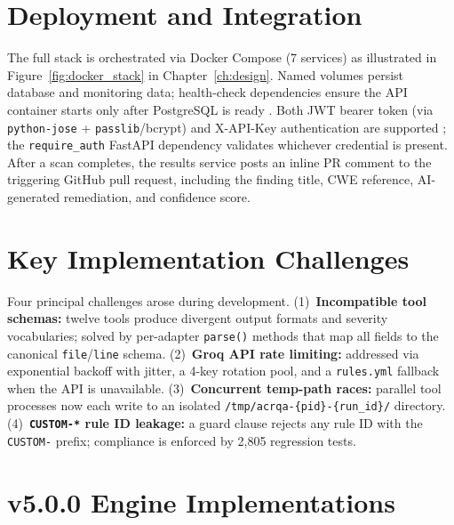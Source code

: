 \section{Deployment and Integration}
\label{sec:docker_impl}

The full stack is orchestrated via Docker Compose (7 services) as illustrated in Figure~\ref{fig:docker_stack} in Chapter~\ref{ch:design}. Named volumes persist database and monitoring data; health-check dependencies ensure the API container starts only after PostgreSQL is ready \cite{docker_security}. Both JWT bearer token (via \texttt{python-jose} + \texttt{passlib}/bcrypt) and X-API-Key authentication are supported \cite{owasp_api_top10}; the \texttt{require\_auth} FastAPI dependency validates whichever credential is present. After a scan completes, the results service posts an inline PR comment to the triggering GitHub pull request, including the finding title, CWE reference, AI-generated remediation, and confidence score.

\section{Key Implementation Challenges}
\label{sec:challenges}

Four principal challenges arose during development. (1)~\textbf{Incompatible tool schemas:} twelve tools produce divergent output formats and severity vocabularies; solved by per-adapter \texttt{parse()} methods that map all fields to the canonical \texttt{file}/\texttt{line} schema. (2)~\textbf{Groq API rate limiting:} addressed via exponential backoff with jitter, a 4-key rotation pool, and a \texttt{rules.yml} fallback when the API is unavailable. (3)~\textbf{Concurrent temp-path races:} parallel tool processes now each write to an isolated \texttt{/tmp/acrqa-\{pid\}-\{run\_id\}/} directory. (4)~\textbf{\texttt{CUSTOM-*} rule ID leakage:} a guard clause rejects any rule ID with the \texttt{CUSTOM-} prefix; compliance is enforced by 2,805 regression tests.

\section{v5.0.0 Engine Implementations}
\label{sec:v5_impl}

